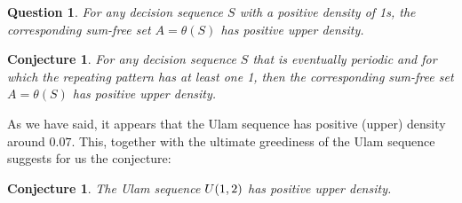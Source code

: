 \documentclass{article}
\newtheorem{conjecture}[theorem]{Conjecture}
\newtheorem{question}[theorem]{Question}
\theoremstyle{definition}
\theoremstyle{remark}
\numberwithin{equation}{section}
\begin{document}
\begin{question}
  For any decision sequence $S$ with a positive density of 1s, the
  corresponding sum-free set $A = \theta(S)$ has positive upper density.
\end{question}

\begin{conjecture}
  For any decision sequence $S$ that is eventually periodic and for
  which the repeating pattern has at least one 1, then the
  corresponding sum-free set $A = \theta(S)$ has positive upper
  density.
\end{conjecture}

As we have said, it appears that the Ulam sequence has positive
(upper) density around $0.07$.  This, together with the ultimate
greediness of the Ulam sequence suggests for us the conjecture:

\begin{conjecture}
  The Ulam sequence $U(1,2)$ has positive upper density.
\end{conjecture}
\end{document}
